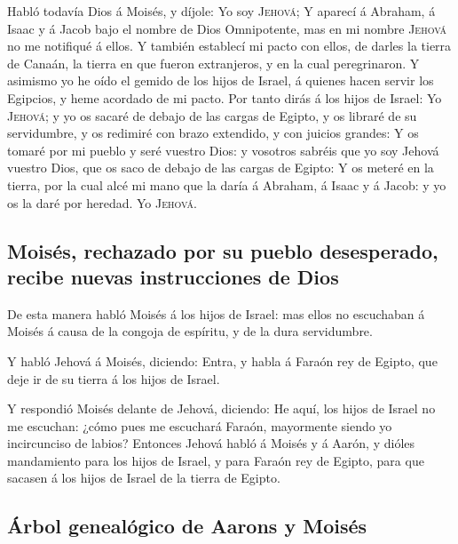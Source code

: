  Habló todavía Dios á Moisés, y díjole: Yo soy
\textsc{Jehová};  Y aparecí á Abraham, á Isaac y á Jacob
bajo el nombre de Dios Omnipotente, mas en mi nombre \textsc{Jehová} no
me notifiqué á ellos.  Y también establecí mi pacto con
ellos, de darles la tierra de Canaán, la tierra en que fueron
extranjeros, y en la cual peregrinaron.  Y asimismo yo he
oído el gemido de los hijos de Israel, á quienes hacen servir los
Egipcios, y heme acordado de mi pacto.  Por tanto dirás á
los hijos de Israel: Yo \textsc{Jehová}; y yo os sacaré de debajo de las
cargas de Egipto, y os libraré de su servidumbre, y os redimiré con
brazo extendido, y con juicios grandes:  Y os tomaré por
mi pueblo y seré vuestro Dios: y vosotros sabréis que yo soy Jehová
vuestro Dios, que os saco de debajo de las cargas de Egipto:
 Y os meteré en la tierra, por la cual alcé mi mano que la
daría á Abraham, á Isaac y á Jacob: y yo os la daré por heredad. Yo
\textsc{Jehová}.

\hypertarget{moisuxe9s-rechazado-por-su-pueblo-desesperado-recibe-nuevas-instrucciones-de-dios}{%
\subsection{Moisés, rechazado por su pueblo desesperado, recibe nuevas
instrucciones de
Dios}\label{moisuxe9s-rechazado-por-su-pueblo-desesperado-recibe-nuevas-instrucciones-de-dios}}

 De esta manera habló Moisés á los hijos de Israel: mas
ellos no escuchaban á Moisés á causa de la congoja de espíritu, y de la
dura servidumbre.

 Y habló Jehová á Moisés, diciendo: 
Entra, y habla á Faraón rey de Egipto, que deje ir de su tierra á los
hijos de Israel.

 Y respondió Moisés delante de Jehová, diciendo: He aquí,
los hijos de Israel no me escuchan: ¿cómo pues me escuchará Faraón,
mayormente siendo yo incircunciso de labios?  Entonces
Jehová habló á Moisés y á Aarón, y dióles mandamiento para los hijos de
Israel, y para Faraón rey de Egipto, para que sacasen á los hijos de
Israel de la tierra de Egipto.

\hypertarget{uxe1rbol-genealuxf3gico-de-aarons-y-moisuxe9s}{%
\subsection{Árbol genealógico de Aarons y
Moisés}\label{uxe1rbol-genealuxf3gico-de-aarons-y-moisuxe9s}}

